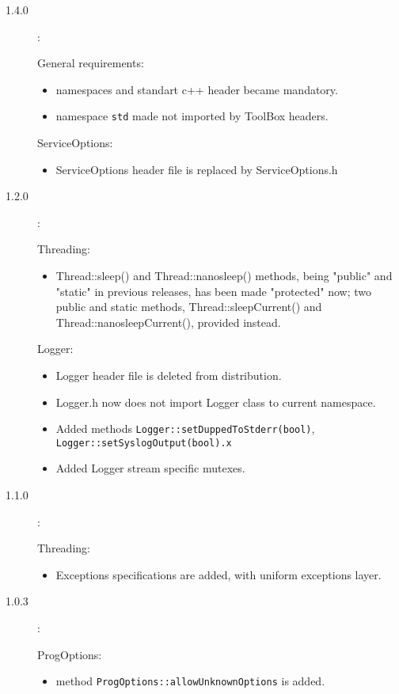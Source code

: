 \documentclass[10pt]{article}
\newenvironment{component}[1]{\par#1:\begin{itemize}}{\end{itemize}}
\begin{document}
\begin{description}
 \item [1.4.0]:

  \begin{component}{General requirements}
   \item namespaces and standart c++ header became mandatory.
   \item namespace \verb|std| made not imported by ToolBox headers.
  \end{component}
  \begin{component}{ServiceOptions}
   \item ServiceOptions header file is replaced by ServiceOptions.h
  \end{component}

 \item [1.2.0]:
    \begin{component}{Threading}
       \item Thread::sleep() and Thread::nanosleep() methods,
             being "public" and "static" in previous releases,
             has been made "protected" now;
             two public and static methods,
             Thread::sleepCurrent() and Thread::nanosleepCurrent(), provided instead.
    \end{component}
    \begin{component}{Logger}
       \item Logger header file is deleted from distribution.
       \item Logger.h now does not import Logger class to current namespace.
       \item Added methods \verb|Logger::setDuppedToStderr(bool)|, 
         \verb|Logger::setSyslogOutput(bool).x|
       \item Added Logger stream specific mutexes.
    \end{component}

 \item [1.1.0]:
    \begin{component}{Threading}
       \item Exceptions specifications are added, with uniform exceptions layer.
    \end{component}

 \item [1.0.3]:

    \begin{component}{ProgOptions}
       \item method \verb|ProgOptions::allowUnknownOptions| is added.
    \end{component}

\end{description}
\end{document}
